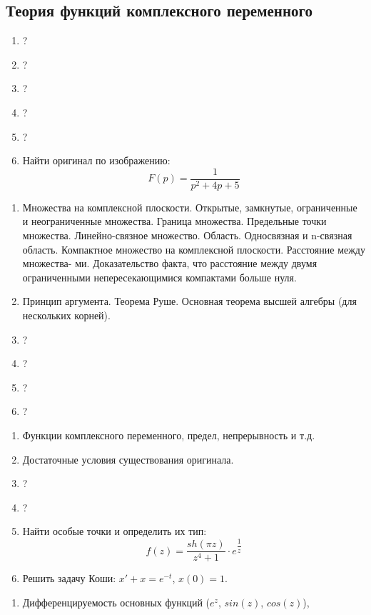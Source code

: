 \documentclass{article}
\newcounter{ticket}[subsection]
\newenvironment{ticket}[1][]{\item[Билет \ifthenelse{\equal{#1}{}}{}{\setcounter{ticket}{#1}}\theticket\refstepcounter{ticket}:]\phantom{}\begin{enumerate}}{\end{enumerate}}
\begin{document}
\subsection*{Теория функций комплексного переменного}
\begin{description}
	\begin{ticket}[6]
		\item ?
		\item ?
		\item ?
		\item ?
		\item ?
		\item Найти оригинал по изображению: \begin{equation*}
			F(p) = \dfrac{1}{p^2 + 4p + 5}
		\end{equation*}
	\end{ticket}
	\begin{ticket}
		\item Множества на комплексной плоскости. Открытые, замкнутые, ограниченные и неограниченные множества. Граница множества. Предельные точки множества. Линейно-связное множество. Область. Односвязная и n-связная область. Компактное множество на комплексной плоскости. Расстояние между множества- ми. Доказательство факта, что расстояние между двумя ограниченными непересекающимися компактами больше нуля.
		\item Принцип аргумента. Теорема Руше. Основная теорема высшей алгебры (для нескольких корней).
		\item ?
		\item ?
		\item ?
		\item ?
	\end{ticket}
	\begin{ticket}
		\item Функции комплексного переменного, предел, непрерывность и т.д.
		\item Достаточные условия существования оригинала.
		\item ?
		\item ?
		\item Найти особые точки и определить их тип: \begin{equation*}
			f(z) = \dfrac{sh(\pi z)}{z^4 + 1}\cdot e^{\dfrac{1}{z}}
		\end{equation*}
		\item Решить задачу Коши: $x' + x = e^{-t}$, $x(0) = 1$.
	\end{ticket}
	\begin{ticket}[10]
		\item Дифференцируемость основных функций ($e^z$, $sin(z)$, $cos(z)$),

\end{ticket}
\end{description}
\end{document}
